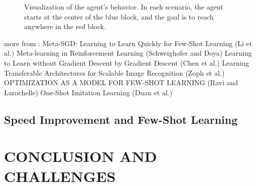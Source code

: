 \documentclass[letterpaper, 10 pt, conference]{ieeeconf}  %
\begin{document}
\begin{figure}[thpb]
        \centering
  \caption{Visualization of the agent’s behavior. In each scenario, the agent starts at the center of the
  blue block, and the goal is to reach anywhere in the red block.  
  }
        \label{figurelabel}
     \end{figure}

more from :  \newline
Meta-SGD: Learning to Learn Quickly for Few-Shot Learning (Li et al.) \newline
Meta-learning in Reinforcement Learning (Schweighofer and Doya) \newline
Learning to Learn without Gradient Descent by Gradient Descent (Chen et al.)
Learning Transferable Architectures for Scalable Image Recognition (Zoph et al.)
OPTIMIZATION AS A MODEL FOR FEW-SHOT LEARNING (Ravi and Larochelle)
One-Shot Imitation Learning (Duan et al.)

\subsection{Speed Improvement and Few-Shot Learning}

\section{CONCLUSION AND CHALLENGES}

\addtolength{\textheight}{-12cm}   %
\end{document}
